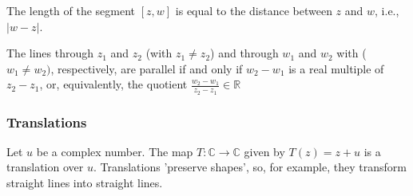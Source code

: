 \documentclass{article}
\begin{document}
			The length of the segment $[z,w]$ is equal to the distance between $z$ and $w$, i.e., $|w-z|$.
			
			The lines through $z_1$ and $z_2$ (with $z_1 \neq z_2$) and through $w_1$ and $w_2$ with ($w_1 \neq w_2)$, respectively, are parallel if and only if $w_2 - w_1$ is a real multiple of $z_2-z_1$, or, equivalently, the quotient $\frac{w_2-w_1}{z_2-z_1} \in \mathbb{R}$
			
			\subsubsection{Translations}
			Let $u$ be a complex number. The map $T: \mathbb{C} \to \mathbb{C}$ given by $T(z) = z+u$ is a translation over $u$. Translations 'preserve shapes', so, for example, they transform straight lines into straight lines.
\end{document}
